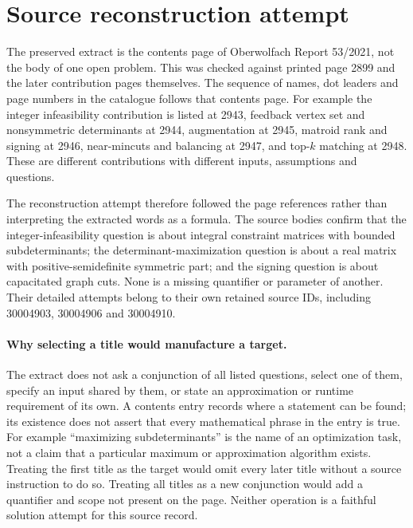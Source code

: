 \documentclass[11pt]{article}
\begin{document}
\section{Source reconstruction attempt}
The preserved extract is the contents page of Oberwolfach Report
53/2021, not the body of one open problem. This was checked
against printed page 2899 and the later contribution pages themselves.
The sequence of names, dot leaders and page numbers in the
catalogue follows that contents page. For example the integer
infeasibility contribution is listed at 2943, feedback vertex set
and nonsymmetric determinants at 2944, augmentation at 2945,
matroid rank and signing at 2946, near-mincuts and balancing at
2947, and top-$k$ matching at 2948. These are different
contributions with different inputs, assumptions and questions.

The reconstruction attempt therefore followed the page references
rather than interpreting the extracted words as a formula. The
source bodies confirm that the integer-infeasibility question is
about integral constraint matrices with bounded subdeterminants;
the determinant-maximization question is about a real matrix with
positive-semidefinite symmetric part; and the signing question is
about capacitated graph cuts. None is a missing quantifier or
parameter of another. Their detailed attempts belong to their own
retained source IDs, including 30004903, 30004906 and 30004910.

\paragraph{Why selecting a title would manufacture a target.}
The extract does not ask a conjunction of all listed questions,
select one of them, specify an input shared by them, or state
an approximation or runtime requirement of its own. A contents
entry records where a statement can be found; its existence does
not assert that every mathematical phrase in the entry is true.
For example ``maximizing subdeterminants'' is the name of an
optimization task, not a claim that a particular maximum or
approximation algorithm exists. Treating the first title as the
target would omit every later title without a source instruction
to do so. Treating all titles as a new conjunction would add
a quantifier and scope not present on the page. Neither operation
is a faithful solution attempt for this source record.
\end{document}
